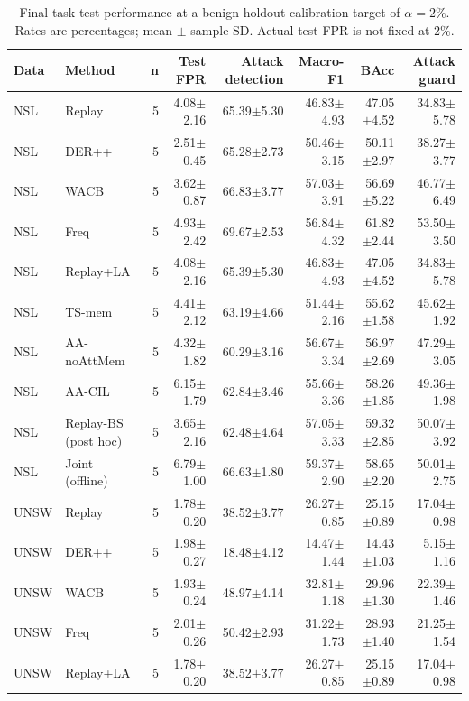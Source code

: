 \begin{table}[t]
\centering\scriptsize
\setlength{\tabcolsep}{3.8pt}
\caption{Final-task test performance at a benign-holdout calibration target of $\alpha=2\%$. Rates are percentages; mean $\pm$ sample SD. Actual test FPR is not fixed at 2\%.}\label{tab:main-results}
\begin{tabular}{llrrrrrr}
\toprule
Data & Method & n & Test FPR & Attack detection & Macro-F1 & BAcc & Attack guard \\
\midrule
NSL & Replay & 5 & 4.08$\pm$2.16 & 65.39$\pm$5.30 & 46.83$\pm$4.93 & 47.05$\pm$4.52 & 34.83$\pm$5.78 \\
NSL & DER++ & 5 & 2.51$\pm$0.45 & 65.28$\pm$2.73 & 50.46$\pm$3.15 & 50.11$\pm$2.97 & 38.27$\pm$3.77 \\
NSL & WACB & 5 & 3.62$\pm$0.87 & 66.83$\pm$3.77 & 57.03$\pm$3.91 & 56.69$\pm$5.22 & 46.77$\pm$6.49 \\
NSL & Freq & 5 & 4.93$\pm$2.42 & 69.67$\pm$2.53 & 56.84$\pm$4.32 & 61.82$\pm$2.44 & 53.50$\pm$3.50 \\
NSL & Replay+LA & 5 & 4.08$\pm$2.16 & 65.39$\pm$5.30 & 46.83$\pm$4.93 & 47.05$\pm$4.52 & 34.83$\pm$5.78 \\
NSL & TS-mem & 5 & 4.41$\pm$2.12 & 63.19$\pm$4.66 & 51.44$\pm$2.16 & 55.62$\pm$1.58 & 45.62$\pm$1.92 \\
NSL & AA-noAttMem & 5 & 4.32$\pm$1.82 & 60.29$\pm$3.16 & 56.67$\pm$3.34 & 56.97$\pm$2.69 & 47.29$\pm$3.05 \\
NSL & AA-CIL & 5 & 6.15$\pm$1.79 & 62.84$\pm$3.46 & 55.66$\pm$3.36 & 58.26$\pm$1.85 & 49.36$\pm$1.98 \\
NSL & Replay-BS (post hoc) & 5 & 3.65$\pm$2.16 & 62.48$\pm$4.64 & 57.05$\pm$3.33 & 59.32$\pm$2.85 & 50.07$\pm$3.92 \\
NSL & Joint (offline) & 5 & 6.79$\pm$1.00 & 66.63$\pm$1.80 & 59.37$\pm$2.90 & 58.65$\pm$2.20 & 50.01$\pm$2.75 \\
UNSW & Replay & 5 & 1.78$\pm$0.20 & 38.52$\pm$3.77 & 26.27$\pm$0.85 & 25.15$\pm$0.89 & 17.04$\pm$0.98 \\
UNSW & DER++ & 5 & 1.98$\pm$0.27 & 18.48$\pm$4.12 & 14.47$\pm$1.44 & 14.43$\pm$1.03 & 5.15$\pm$1.16 \\
UNSW & WACB & 5 & 1.93$\pm$0.24 & 48.97$\pm$4.14 & 32.81$\pm$1.18 & 29.96$\pm$1.30 & 22.39$\pm$1.46 \\
UNSW & Freq & 5 & 2.01$\pm$0.26 & 50.42$\pm$2.93 & 31.22$\pm$1.73 & 28.93$\pm$1.40 & 21.25$\pm$1.54 \\
UNSW & Replay+LA & 5 & 1.78$\pm$0.20 & 38.52$\pm$3.77 & 26.27$\pm$0.85 & 25.15$\pm$0.89 & 17.04$\pm$0.98 \\

\end{tabular}
\end{table}
